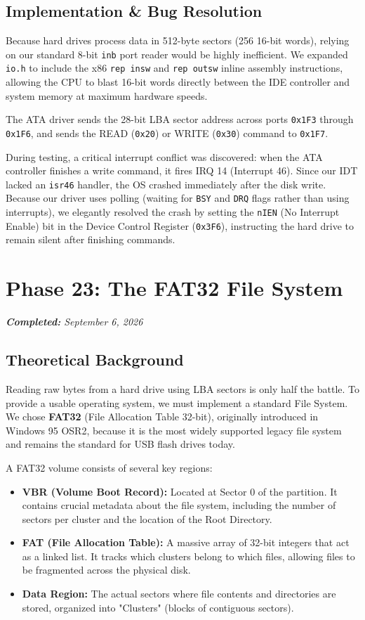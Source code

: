 \documentclass[12pt,a4paper]{report}
\begin{document}
\subsection{Implementation \& Bug Resolution}
Because hard drives process data in 512-byte sectors (256 16-bit words), relying on our standard 8-bit \texttt{inb} port reader would be highly inefficient. We expanded \texttt{io.h} to include the x86 \texttt{rep insw} and \texttt{rep outsw} inline assembly instructions, allowing the CPU to blast 16-bit words directly between the IDE controller and system memory at maximum hardware speeds.

The ATA driver sends the 28-bit LBA sector address across ports \texttt{0x1F3} through \texttt{0x1F6}, and sends the READ (\texttt{0x20}) or WRITE (\texttt{0x30}) command to \texttt{0x1F7}. 

During testing, a critical interrupt conflict was discovered: when the ATA controller finishes a write command, it fires IRQ 14 (Interrupt 46). Since our IDT lacked an \texttt{isr46} handler, the OS crashed immediately after the disk write. Because our driver uses polling (waiting for \texttt{BSY} and \texttt{DRQ} flags rather than using interrupts), we elegantly resolved the crash by setting the \texttt{nIEN} (No Interrupt Enable) bit in the Device Control Register (\texttt{0x3F6}), instructing the hard drive to remain silent after finishing commands. 

\newpage

\section{Phase 23: The FAT32 File System}
{\small\textit{\textbf{Completed:} September 6, 2026}}\par\medskip

\subsection{Theoretical Background}
Reading raw bytes from a hard drive using LBA sectors is only half the battle. To provide a usable operating system, we must implement a standard File System. We chose \textbf{FAT32} (File Allocation Table 32-bit), originally introduced in Windows 95 OSR2, because it is the most widely supported legacy file system and remains the standard for USB flash drives today.

A FAT32 volume consists of several key regions:
\begin{itemize}
    \item \textbf{VBR (Volume Boot Record):} Located at Sector 0 of the partition. It contains crucial metadata about the file system, including the number of sectors per cluster and the location of the Root Directory.
    \item \textbf{FAT (File Allocation Table):} A massive array of 32-bit integers that act as a linked list. It tracks which clusters belong to which files, allowing files to be fragmented across the physical disk.
    \item \textbf{Data Region:} The actual sectors where file contents and directories are stored, organized into "Clusters" (blocks of contiguous sectors).
\end{itemize}
\end{document}
